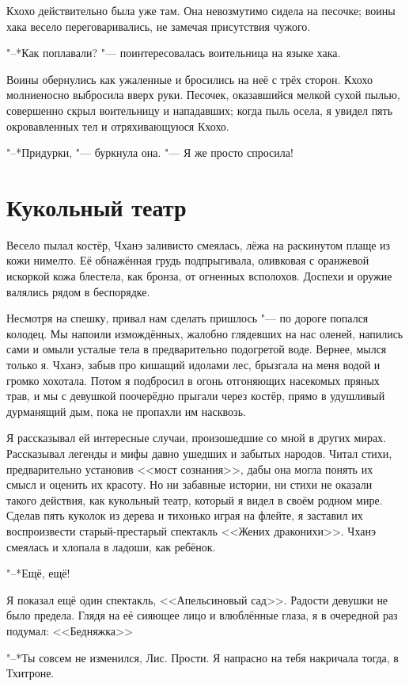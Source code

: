Кхохо действительно была уже там.
Она невозмутимо сидела на песочке;
воины хака весело переговаривались, не замечая присутствия чужого.

"--*Как поплавали? "--- поинтересовалась воительница на языке хака.

Воины обернулись как ужаленные и бросились на неё с трёх сторон.
Кхохо молниеносно выбросила вверх руки.
Песочек, оказавшийся мелкой сухой пылью, совершенно скрыл воительницу и нападавших;
когда пыль осела, я увидел пять окровавленных тел и отряхивающуюся Кхохо.

"--*Придурки, "--- буркнула она.
"--- Я же просто спросила!

\section{Кукольный театр}

Весело пылал костёр, Чханэ заливисто смеялась, лёжа на раскинутом плаще из кожи нимелто.
Её обнажённая грудь подпрыгивала, оливковая с оранжевой искоркой кожа блестела, как бронза, от огненных всполохов.
Доспехи и оружие валялись рядом в беспорядке.

Несмотря на спешку, привал нам сделать пришлось "--- по дороге попался колодец.
Мы напоили измождённых, жалобно глядевших на нас оленей, напились сами и омыли усталые тела в предварительно подогретой воде.
Вернее, мылся только я.
Чханэ, забыв про кишащий идолами лес, брызгала на меня водой и громко хохотала.
Потом я подбросил в огонь отгоняющих насекомых пряных трав, и мы с девушкой поочерёдно прыгали через костёр, прямо в удушливый дурманящий дым, пока не пропахли им насквозь.

Я рассказывал ей интересные случаи, произошедшие со мной в других мирах.
Рассказывал легенды и мифы давно ушедших и забытых народов.
Читал стихи, предварительно установив <<мост сознания>>, дабы она могла понять их смысл и оценить их красоту.
Но ни забавные истории, ни стихи не оказали такого действия, как кукольный театр, который я видел в своём родном мире.
Сделав пять куколок из дерева и тихонько играя на флейте, я заставил их воспроизвести старый-престарый спектакль <<Жених драконихи>>.
Чханэ смеялась и хлопала в ладоши, как ребёнок.

"--*Ещё, ещё!

Я показал ещё один спектакль, <<Апельсиновый сад>>.
Радости девушки не было предела.
Глядя на её сияющее лицо и влюблённые глаза, я в очередной раз подумал: <<Бедняжка\ldotst>>

"--*Ты совсем не изменился, Лис.
Прости.
Я напрасно на тебя накричала тогда, в Тхитроне.


